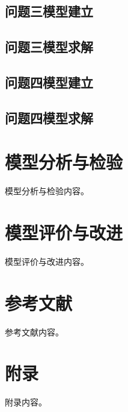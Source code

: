 \documentclass[withoutpreface,bwprint]{cumcmthesis}
\begin{document}
\subsection{问题三模型建立}

\subsection{问题三模型求解}

\subsection{问题四模型建立}

\subsection{问题四模型求解}


\section{模型分析与检验}
模型分析与检验内容。

\section{模型评价与改进}
模型评价与改进内容。

\section{参考文献}
参考文献内容。

\section{附录}
附录内容。
\end{document}
